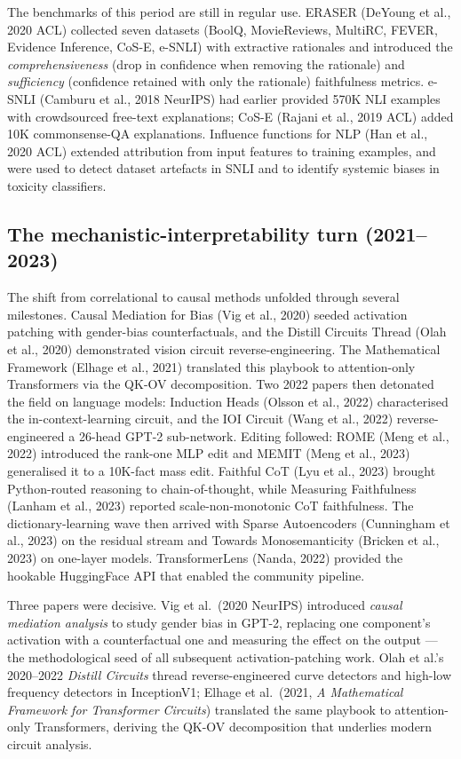 The benchmarks of this period are still in regular use. ERASER (DeYoung et al., 2020 ACL) collected seven datasets (BoolQ, MovieReviews, MultiRC, FEVER, Evidence Inference, CoS-E, e-SNLI) with extractive rationales and introduced the \emph{comprehensiveness} (drop in confidence when removing the rationale) and \emph{sufficiency} (confidence retained with only the rationale) faithfulness metrics. e-SNLI (Camburu et al., 2018 NeurIPS) had earlier provided 570K NLI examples with crowdsourced free-text explanations; CoS-E (Rajani et al., 2019 ACL) added 10K commonsense-QA explanations. Influence functions for NLP (Han et al., 2020 ACL) extended attribution from input features to training examples, and were used to detect dataset artefacts in SNLI and to identify systemic biases in toxicity classifiers.

\subsection{The mechanistic-interpretability turn (2021--2023)}\label{the-mechanistic-interpretability-turn-20212023}

The shift from correlational to causal methods unfolded through several milestones. Causal Mediation for Bias (Vig et al., 2020) seeded activation patching with gender-bias counterfactuals, and the Distill Circuits Thread (Olah et al., 2020) demonstrated vision circuit reverse-engineering. The Mathematical Framework (Elhage et al., 2021) translated this playbook to attention-only Transformers via the QK-OV decomposition. Two 2022 papers then detonated the field on language models: Induction Heads (Olsson et al., 2022) characterised the in-context-learning circuit, and the IOI Circuit (Wang et al., 2022) reverse-engineered a 26-head GPT-2 sub-network. Editing followed: ROME (Meng et al., 2022) introduced the rank-one MLP edit and MEMIT (Meng et al., 2023) generalised it to a 10K-fact mass edit. Faithful CoT (Lyu et al., 2023) brought Python-routed reasoning to chain-of-thought, while Measuring Faithfulness (Lanham et al., 2023) reported scale-non-monotonic CoT faithfulness. The dictionary-learning wave then arrived with Sparse Autoencoders (Cunningham et al., 2023) on the residual stream and Towards Monosemanticity (Bricken et al., 2023) on one-layer models. TransformerLens (Nanda, 2022) provided the hookable HuggingFace API that enabled the community pipeline.

Three papers were decisive. Vig et al.~(2020 NeurIPS) introduced \emph{causal mediation analysis} to study gender bias in GPT-2, replacing one component's activation with a counterfactual one and measuring the effect on the output --- the methodological seed of all subsequent activation-patching work. Olah et al.'s 2020--2022 \emph{Distill Circuits} thread reverse-engineered curve detectors and high-low frequency detectors in InceptionV1; Elhage et al.~(2021, \emph{A Mathematical Framework for Transformer Circuits}) translated the same playbook to attention-only Transformers, deriving the QK-OV decomposition that underlies modern circuit analysis.

